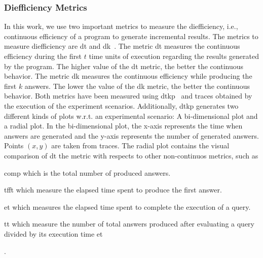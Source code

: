 \subsubsection{Diefficiency Metrics}\label{prem:dief}
In this work, we use two important metrics to measure the diefficiency, i.e., continuous efficiency of a program to generate incremental results. The metrics to measure diefficiency are \acrshort{dt} and \acrshort{dk}~\cite{diefpaper}. The metric \acrshort{dt} measures the continuous efficiency during the first $t$ time units of execution regarding the results generated by the program. The higher value of the \acrshort{dt} metric, the better the continuous behavior. The metric \acrshort{dk} measures the continuous efficiency while producing the first $k$ answers. The lower the value of the \acrshort{dk} metric, the better the continuous behavior.
Both metrics have been measured using \acrfull{dtkp}~\cite{diefpy} and traces obtained by the execution of the experiment scenarios.
Additionally, \acrshort{dtkp} generates two different kinds of plots w.r.t. an experimental scenario: A bi-dimensional plot  and a radial plot. In the bi-dimensional plot, the x-axis represents the time when answers  are generated and the y-axis represents the number of generated answers. Points  $(x,y)$  are taken from traces.  The radial plot contains the visual comparison of \acrshort{dt} the metric with respects to other non-continuos metrics, such as 
\begin{inparaenum}[\bf i\upshape)]
  \item \acrfull{comp} which is the total number of  produced answers. 
  \item \acrfull{tfft} which measure the elapsed time spent to produce the first answer. 
  \item \acrfull{et} which measures the elapsed time spent  to complete the execution of a query. 
  \item \acrfull{tt} which measure the number of total answers produced after evaluating a query divided by its execution time \acrshort{et}
\end{inparaenum}.

